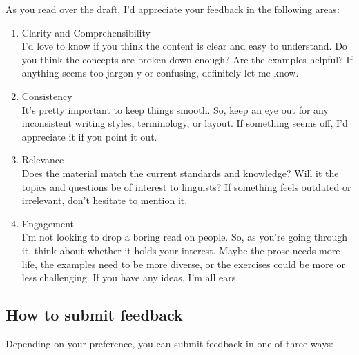 \documentclass[
  letterpaper,
  DIV=11,
  numbers=noendperiod]{scrreport}
\theoremstyle{definition}
\theoremstyle{remark}
\begin{document}
As you read over the draft, I'd appreciate your feedback in the
following areas:

\begin{enumerate}
\def\labelenumi{\arabic{enumi}.}
\item
  Clarity and Comprehensibility\\
  I'd love to know if you think the content is clear and easy to
  understand. Do you think the concepts are broken down enough? Are the
  examples helpful? If anything seems too jargon-y or confusing,
  definitely let me know.
\item
  Consistency\\
  It's pretty important to keep things smooth. So, keep an eye out for
  any inconsistent writing styles, terminology, or layout. If something
  seems off, I'd appreciate it if you point it out.
\item
  Relevance\\
  Does the material match the current standards and knowledge? Will it
  the topics and questions be of interest to linguists? If something
  feels outdated or irrelevant, don't hesitate to mention it.
\item
  Engagement\\
  \hspace{0pt}I\hspace{0pt}'m not looking to drop a boring read on
  people. So, as you're going through it, think about whether it holds
  your interest. Maybe \hspace{0pt}the prose needs more life, the
  examples need to be more diverse, or the exercises could be more or
  less challenging. If you have any ideas, I'm all ears.
\end{enumerate}

\hypertarget{how-to-submit-feedback}{%
\subsection*{How to submit feedback}\label{how-to-submit-feedback}}

Depending on your preference, you can submit feedback in one of three
ways:
\end{document}
